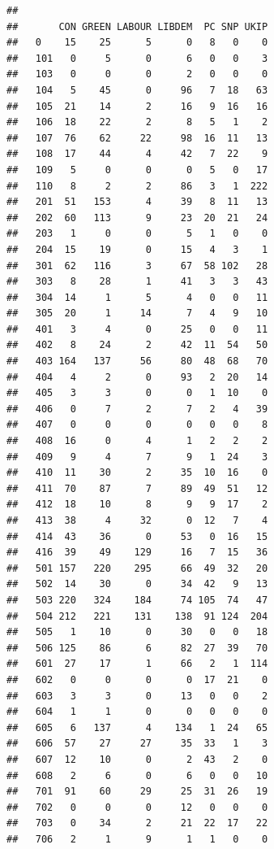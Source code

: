 \documentclass[
]{book}
\newenvironment{Shaded}{\begin{snugshade}}{\end{snugshade}}
\newcommand{\FunctionTok}[1]{\textcolor[rgb]{0.00,0.00,0.00}{#1}}
\newcommand{\NormalTok}[1]{#1}
\newcommand{\SpecialCharTok}[1]{\textcolor[rgb]{0.00,0.00,0.00}{#1}}
\begin{document}
\begin{Shaded}
\end{Shaded}

\begin{verbatim}
##      
##       CON GREEN LABOUR LIBDEM  PC SNP UKIP
##   0    15    25      5      0   8   0    0
##   101   0     5      0      6   0   0    3
##   103   0     0      0      2   0   0    0
##   104   5    45      0     96   7  18   63
##   105  21    14      2     16   9  16   16
##   106  18    22      2      8   5   1    2
##   107  76    62     22     98  16  11   13
##   108  17    44      4     42   7  22    9
##   109   5     0      0      0   5   0   17
##   110   8     2      2     86   3   1  222
##   201  51   153      4     39   8  11   13
##   202  60   113      9     23  20  21   24
##   203   1     0      0      5   1   0    0
##   204  15    19      0     15   4   3    1
##   301  62   116      3     67  58 102   28
##   303   8    28      1     41   3   3   43
##   304  14     1      5      4   0   0   11
##   305  20     1     14      7   4   9   10
##   401   3     4      0     25   0   0   11
##   402   8    24      2     42  11  54   50
##   403 164   137     56     80  48  68   70
##   404   4     2      0     93   2  20   14
##   405   3     3      0      0   1  10    0
##   406   0     7      2      7   2   4   39
##   407   0     0      0      0   0   0    8
##   408  16     0      4      1   2   2    2
##   409   9     4      7      9   1  24    3
##   410  11    30      2     35  10  16    0
##   411  70    87      7     89  49  51   12
##   412  18    10      8      9   9  17    2
##   413  38     4     32      0  12   7    4
##   414  43    36      0     53   0  16   15
##   416  39    49    129     16   7  15   36
##   501 157   220    295     66  49  32   20
##   502  14    30      0     34  42   9   13
##   503 220   324    184     74 105  74   47
##   504 212   221    131    138  91 124  204
##   505   1    10      0     30   0   0   18
##   506 125    86      6     82  27  39   70
##   601  27    17      1     66   2   1  114
##   602   0     0      0      0  17  21    0
##   603   3     3      0     13   0   0    2
##   604   1     1      0      0   0   0    0
##   605   6   137      4    134   1  24   65
##   606  57    27     27     35  33   1    3
##   607  12    10      0      2  43   2    0
##   608   2     6      0      6   0   0   10
##   701  91    60     29     25  31  26   19
##   702   0     0      0     12   0   0    0
##   703   0    34      2     21  22  17   22
##   706   2     1      9      1   1   0    0
\end{verbatim}
\end{document}
